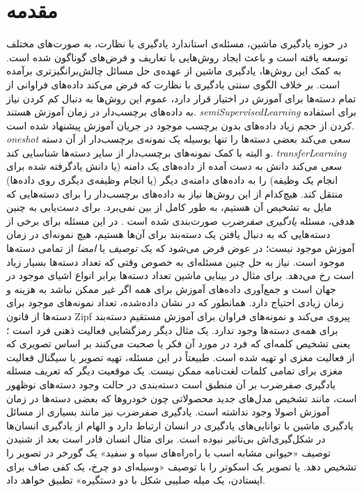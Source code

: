 \chapter{مقدمه } \label{intro}

 در حوزه یادگیری ماشین، مسئله‌ی استاندارد یادگیری با نظارت، به صورت‌های مختلف توسعه یافته است و باعث ایجاد روش‌هایی با تعاریف و فرض‌های گوناگون شده است. به کمک این روش‌ها، یادگیری ماشین از عهده‌ی حل مسائل چالش‌برانگیزتری برآمده است. بر خلاف الگوی سنتی یادگیری با نظارت که فرض می‌کند داده‌های فراوانی از تمام دسته‌ها برای آموزش در اختیار قرار دارد، عموم این روش‌ها به دنبال کم کردن نیاز به داده‌های برچسب‌دار در زمان آموزش هستند.
\emph{\gls{semiSupervisedLearning}}\cite{chapel06}
برای استفاده کردن از حجم زیاد داده‌های بدون برچسب موجود در جریان آموزش پیشنهاد شده است.
\emph{\gls{oneshot}} \cite{miller12}
سعی می‌کند بعضی دسته‌ها را تنها بوسیله یک نمونه‌ی برچسب‌دار از آن دسته و البته با کمک نمونه‌های برچسب‌دار از سایر دسته‌ها شناسایی کند.
\emph{\gls{transferLearning}} \cite{pan10survey}
سعی می‌کند دانش به دست آمده از داده‌های یک دامنه (یا دانش یادگرفته شده برای انجام یک وظیفه) را به داده‌های دامنه‌ی دیگر (یا انجام وظیفه‌ی دیگری روی داده‌ها) منتقل کند.
هیچ‌کدام از این روش‌ها نیاز به داده‌های برچسب‌دار را برای دسته‌هایی که مایل به تشخیص آن هستیم، به طور کامل از بین نمی‌برد. برای دست‌یابی به چنین هدفی،
مسئله \textit{یادگیری صفرضرب}  صورت‌بندی شده است \cite{bengio08}. در این مسئله برای برخی از دسته‌هایی که به دنبال یافتن یک دسته‌بند برای آن‌ها هستیم، هیچ نمونه‌ای در زمان آموزش موجود نیست؛ در عوض  فرض می‌شود که یک \emph{ توصیف} یا \emph{امضا}  از تمامی دسته‌ها موجود است. نیاز به حل  چنین مسئله‌ای به خصوص وقتی که تعداد دسته‌ها بسیار زیاد است رخ می‌دهد. برای مثال در بینایی ماشین تعداد دسته‌ها برابر انواع اشیای موجود در جهان است و جمع‌آوری داده‌های آموزش برای همه اگر غیر ممکن نباشد به هزینه و زمان زیادی احتیاج دارد. همانطور که در
\cite{sala11}
نشان داده‌شده، تعداد نمونه‌های موجود برای دسته‌ها از قانون Zipf 
\cite{newman2005power}
پیروی می‌کند و نمونه‌های فراوان برای آموزش مستقیم دسته‌بند برای همه‌ی دسته‌ها وجود ندارد.
 یک مثال دیگر رمزگشایی فعالیت ذهنی فرد است
\cite{hinton09}؛
یعنی تشخیص کلمه‌ای که فرد در مورد آن فکر یا صحبت می‌کنند بر اساس تصویری که از فعالیت مغزی او تهیه شده است. طبیعتاً در این مسئله، تهیه تصویر یا سیگنال فعالیت مغزی برای تمامی کلمات لغت‌نامه ممکن نیست. یک موقعیت دیگر که تعریف مسئله یادگیری صفرضرب بر آن منطبق است دسته‌بندی در حالت وجود دسته‌های نوظهور است، مانند تشخیص مدل‌های جدید محصولاتی چون خودروها که بعضی دسته‌ها در زمان آموزش اصولا وجود نداشته است. یادگیری صفرضرب نیز مانند بسیاری از مسائل یادگیری ماشین با توانایی‌های یادگیری در انسان ارتباط دارد و الهام از یادگیری انسان‌ها در شکل‌گیری‌اش بی‌تاثیر نبوده است. برای مثال انسان قادر است بعد از شنیدن توصیف «حیوانی مشابه اسب با راه‌راه‌های سیاه و سفید» یک گورخر در تصویر را تشخیص دهد. یا تصویر یک اسکوتر را با توصیف «وسیله‌ای دو چرخ، یک کفی صاف برای ایستادن، یک میله صلیبی شکل با دو دستگیره» تطبیق خواهد داد.

